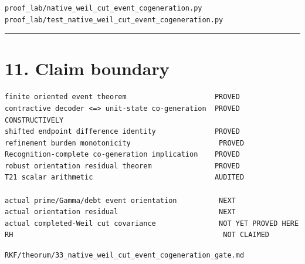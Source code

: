 \begin{verbatim}
proof_lab/native_weil_cut_event_cogeneration.py
proof_lab/test_native_weil_cut_event_cogeneration.py
\end{verbatim}

\begin{center}\rule{0.5\linewidth}{0.5pt}\end{center}

\hypertarget{claim-boundary}{%
\section{11. Claim boundary}\label{claim-boundary}}

\begin{verbatim}
finite oriented event theorem                     PROVED
contractive decoder <=> unit-state co-generation  PROVED CONSTRUCTIVELY
shifted endpoint difference identity              PROVED
refinement burden monotonicity                     PROVED
Recognition-complete co-generation implication    PROVED
robust orientation residual theorem               PROVED
T21 scalar arithmetic                             AUDITED

actual prime/Gamma/debt event orientation          NEXT
actual orientation residual                        NEXT
actual completed-Weil cut covariance               NOT YET PROVED HERE
RH                                                  NOT CLAIMED
\end{verbatim}

\begin{flushright}\small\texttt{RKF/theorum/33\_native\_weil\_cut\_event\_cogeneration\_gate.md}\end{flushright}
